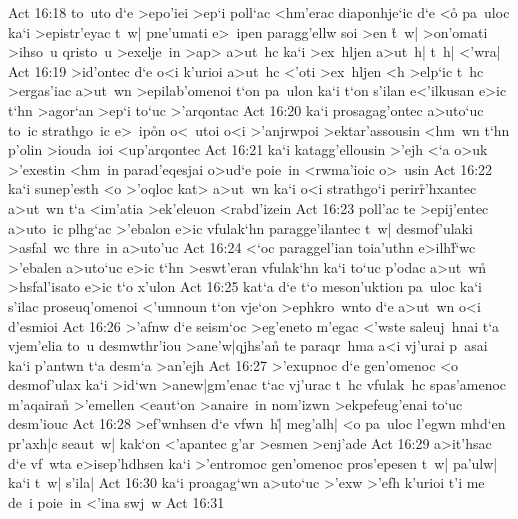 \vs Act 16:18
to~uto
d`e
>epo'iei
>ep`i
poll`ac
<hm'erac
diaponhje`ic
d`e
<o\r{}
pa~uloc
ka`i
>epistr'eyac
t~w|
pne'umati
e>~ipen
paragg'ellw
soi
>en
\r{t}~w|
>on'omati
>ihso~u
qristo~u
>exelje~in
>ap>
a>ut~hc
ka`i
>ex~hljen
a>ut~h|
t~h|
<'wra|\bibvsend
\vs Act 16:19
>id'ontec
d`e
o<i
k'urioi
a>ut~hc
<'oti
>ex~hljen
<h
>elp`ic
t~hc
>ergas'iac
a>ut~wn
>epilab'omenoi
t`on
pa~ulon
ka`i
t`on
s'ilan
e<'ilkusan
e>ic
t`hn
>agor`an
>ep`i
to`uc
>'arqontac\bibvsend
\vs Act 16:20
ka`i
prosagag'ontec
a>uto`uc
to~ic
strathgo~ic
e>~ip\r{o}n
o<~utoi
o<i
>'anjrwpoi
>ektar'assousin
<hm~wn
t`hn
p'olin
>iouda~ioi
<up'arqontec\bibvsend
\vs Act 16:21
ka`i
katagg'ellousin
>'ejh
<`a
o>uk
>'exestin
<hm~in
parad'eqesjai
o>ud`e
poie~in
<rwma'ioic
o>~usin\bibvsend
\vs Act 16:22
ka`i
sunep'esth
<o
>'oqloc
kat>
a>ut~wn
ka`i
o<i
strathgo`i
perir\r{r}'hxantec
a>ut~wn
t`a
<im'atia
>ek'eleuon
<rabd'izein\bibvsend
\vs Act 16:23
poll'ac
te
>epij'entec
a>uto~ic
plhg`ac
>'ebalon
e>ic
vfulak`hn
paragge'ilantec
t~w|
desmof'ulaki
>asfal~wc
thre~in
a>uto'uc\bibvsend
\vs Act 16:24
<`oc
paraggel'ian
toia'uthn
e>ilh\r{f}`wc
>'ebalen
a>uto`uc
e>ic
t`hn
>eswt'eran
vfulak`hn
ka`i
to`uc
p'odac
a>ut~wn\r{}
>hsfal'isato
e>ic
t`o
x'ulon\bibvsend
\vs Act 16:25
kat`a
d`e
t`o
meson'uktion
pa~uloc
ka`i
s'ilac
proseuq'omenoi
<'umnoun
t`on
vje`on
>ephkro~wnto
d`e
a>ut~wn
o<i
d'esmioi\bibvsend
\vs Act 16:26
>'afnw
d`e
seism`oc
>eg'eneto
m'egac
<'wste
saleuj~hnai
t`a
vjem'elia
to~u
desmwthr'iou
>ane'w|qjhs'an\r{}
te
paraqr~hma
a<i
vj'urai
p~asai
ka`i
p'antwn
t`a
desm`a
>an'ejh\bibvsend
\vs Act 16:27
>'exupnoc
d`e
gen'omenoc
<o
desmof'ulax
ka`i
>id`wn
>anew|gm'enac
t`ac
vj'urac
t~hc
vfulak~hc
spas'amenoc
m'aqairan\r{}
>'emellen
<eaut`on
>anaire~in
nom'izwn
>ekpefeug'enai
to`uc
desm'iouc\bibvsend
\vs Act 16:28
>ef'wnhsen
d`e
vfwn~h|\r{}
meg'alh|
<o
pa~uloc
l'egwn
mhd`en
pr'axh|c
seaut~w|
kak`on
<'apantec
g'ar
>esmen
>enj'ade\bibvsend
\vs Act 16:29
a>it'hsac
d`e
vf~wta
e>isep'hdhsen
ka`i
>'entromoc
gen'omenoc
pros'epesen
t~w|
pa'ulw|
ka`i
t~w|
s'ila|\bibvsend
\vs Act 16:30
ka`i
proagag`wn
a>uto`uc
>'exw
>'efh
k'urioi
t'i
me
de~i
poie~in
<'ina
swj~w\bibvsend
\vs Act 16:31
